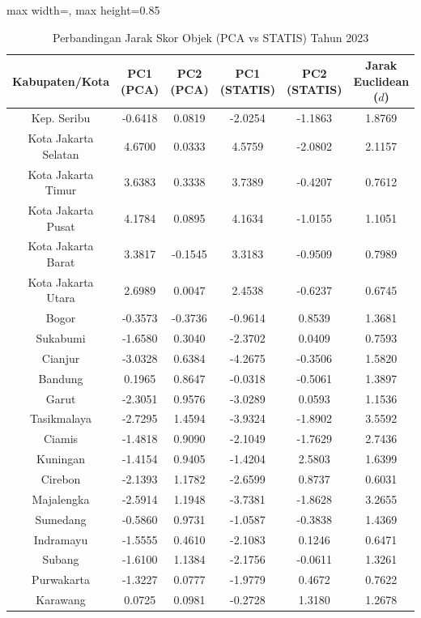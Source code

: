 \begin{table}[H]
\centering
\caption{Perbandingan Jarak Skor Objek (PCA vs STATIS) Tahun 2023} \label{tab:app1jarak_skor_2023}
\begin{adjustbox}{max width=\textwidth, max height=0.85\textheight}
\begin{tabular}{|c|c|c|c|c|c|}
\hline
\textbf{Kabupaten/Kota} & \textbf{PC1 (PCA)} & \textbf{PC2 (PCA)} & \textbf{PC1 (STATIS)} & \textbf{PC2 (STATIS)} & \textbf{Jarak Euclidean ($d$)} \\
\hline
Kep. Seribu & -0.6418 & 0.0819 & -2.0254 & -1.1863 & 1.8769 \\
Kota Jakarta Selatan & 4.6700 & 0.0333 & 4.5759 & -2.0802 & 2.1157 \\
Kota Jakarta Timur & 3.6383 & 0.3338 & 3.7389 & -0.4207 & 0.7612 \\
Kota Jakarta Pusat & 4.1784 & 0.0895 & 4.1634 & -1.0155 & 1.1051 \\
Kota Jakarta Barat & 3.3817 & -0.1545 & 3.3183 & -0.9509 & 0.7989 \\
Kota Jakarta Utara & 2.6989 & 0.0047 & 2.4538 & -0.6237 & 0.6745 \\
Bogor & -0.3573 & -0.3736 & -0.9614 & 0.8539 & 1.3681 \\
Sukabumi & -1.6580 & 0.3040 & -2.3702 & 0.0409 & 0.7593 \\
Cianjur & -3.0328 & 0.6384 & -4.2675 & -0.3506 & 1.5820 \\
Bandung & 0.1965 & 0.8647 & -0.0318 & -0.5061 & 1.3897 \\
Garut & -2.3051 & 0.9576 & -3.0289 & 0.0593 & 1.1536 \\
Tasikmalaya & -2.7295 & 1.4594 & -3.9324 & -1.8902 & 3.5592 \\
Ciamis & -1.4818 & 0.9090 & -2.1049 & -1.7629 & 2.7436 \\
Kuningan & -1.4154 & 0.9405 & -1.4204 & 2.5803 & 1.6399 \\
Cirebon & -2.1393 & 1.1782 & -2.6599 & 0.8737 & 0.6031 \\
Majalengka & -2.5914 & 1.1948 & -3.7381 & -1.8628 & 3.2655 \\
Sumedang & -0.5860 & 0.9731 & -1.0587 & -0.3838 & 1.4369 \\
Indramayu & -1.5555 & 0.4610 & -2.1083 & 0.1246 & 0.6471 \\
Subang & -1.6100 & 1.1384 & -2.1756 & -0.0611 & 1.3261 \\
Purwakarta & -1.3227 & 0.0777 & -1.9779 & 0.4672 & 0.7622 \\
Karawang & 0.0725 & 0.0981 & -0.2728 & 1.3180 & 1.2678 \\

\end{tabular}
\end{adjustbox}
\end{table}

